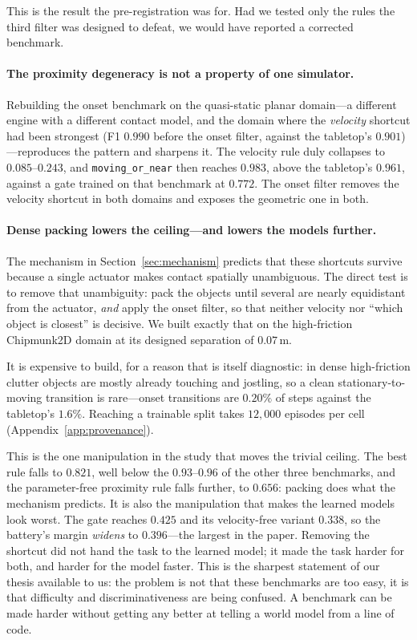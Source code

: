 \documentclass{article}
\begin{document}
This is the result the pre-registration was for. Had we tested only the rules the third filter
was designed to defeat, we would have reported a corrected benchmark.

\paragraph{The proximity degeneracy is not a property of one simulator.} Rebuilding the onset
benchmark on the quasi-static planar domain---a different engine with a different contact
model, and the domain where the \emph{velocity} shortcut had been strongest (F1 $0.990$ before
the onset filter, against the tabletop's $0.901$)---reproduces the pattern and sharpens it.
The velocity rule duly collapses to $0.085$--$0.243$, and \texttt{moving\_or\_near} then
reaches $0.983$, above the tabletop's $0.961$, against a gate trained on that benchmark at
$0.772$. The
onset filter removes the velocity shortcut in both domains and exposes the geometric one in
both.

\paragraph{Dense packing lowers the ceiling---and lowers the models further.} The mechanism in
Section~\ref{sec:mechanism} predicts that these shortcuts survive because a single actuator
makes contact spatially unambiguous. The direct test is to remove that unambiguity: pack the
objects until several are nearly equidistant from the actuator, \emph{and} apply the onset
filter, so that neither velocity nor ``which object is closest'' is decisive. We built exactly
that on the high-friction Chipmunk2D domain at its designed separation of $0.07$\,m.

It is expensive to build, for a reason that is itself diagnostic: in dense high-friction
clutter objects are mostly already touching and jostling, so a clean stationary-to-moving
transition is rare---onset transitions are $0.20\%$ of steps against the tabletop's $1.6\%$. Reaching
a trainable split takes $12{,}000$ episodes per cell (Appendix~\ref{app:provenance}).

This is the one manipulation in the study that moves the trivial ceiling. The best rule falls
to $0.821$, well below the $0.93$--$0.96$ of the other three benchmarks, and the
parameter-free proximity rule falls further, to $0.656$: packing does what the mechanism
predicts. It is also the manipulation that makes the learned models look worst. The gate
reaches $0.425$ and its velocity-free variant $0.338$, so the battery's margin \emph{widens} to
$0.396$---the largest in the paper. Removing the shortcut did not hand the task to the learned
model; it made the task harder for both, and harder for the model faster. This is the sharpest
statement of our thesis available to us: the problem is not that these benchmarks are too easy,
it is that difficulty and discriminativeness are being confused. A benchmark can be made harder
without getting any better at telling a world model from a line of code.
\end{document}
